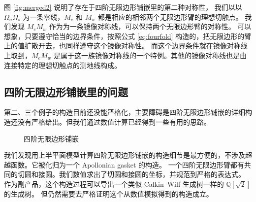 \documentclass[a4paper,12pt]{article}
\numberwithin{problem}{section}
\numberwithin{definition}{section}
\numberwithin{lemma}{section}
\numberwithin{proposition}{section}
\numberwithin{theorem}{section}
\numberwithin{grammar}{section}
\numberwithin{program}{section}
\numberwithin{convention}{section}
\numberwithin{corollary}{section}
\begin{document}
图 \ref{fig:merged2} 说明了存在于四阶无限边形铺嵌里的第二种对称性，
我们以以 $\Omega_n \Omega_s$ 为一条零线，$M_e$ 和 $M_w$ 都是相应的相邻两个无限边形臂的理想切触点。
我们发现 $M_e M_w$ 作为为一条镜像对称线，可以保持两个无限边形臂的对称性。
可以想象，只要遵守恰当的边界条件，按照公式 \ref{eq:fourfold} 构造的，把无限边形的臂上的值扩散开去，也同样遵守这个镜像对称性。
而这个边界条件就在镜像对称线上取到，$M_e M_w$ 是属于这一族镜像对称线的一个特例。其他的镜像对称线也是由连接特定的理想切触点的测地线构成。

\subsection{四阶无限边形铺嵌里的问题}

第二、三个例子的构造目前还没能严格化，主要障碍是四阶无限边形铺嵌的详细构造还没有严格给出。但我们通过数值计算已经得到一些有用的思路。

\begin{figure}[ht]
    \centering
    \caption{四阶无限边形铺嵌}\label{fig:apeirogon}
\end{figure}

我们发现用上半平面模型计算四阶无限边形铺嵌的构造细节是最方便的，不涉及超越函数。它被化归为一个 Apollonian gasket 的构造。
一个四阶无限边形臂都有共同的切圆和接圆。我们数值求出了切圆和接圆的坐标，并规范到严格的表达式。
作为副产品，这个构造过程可以导出一个类似 Calkin–Wilf 生成树一样的 $\mathbb{Q}[\sqrt{2}]$ 的生成树。
但仍然需要去严格证明这个从数值模拟得到的构造成立。
\end{document}
